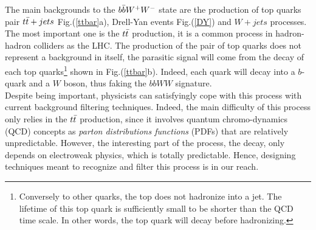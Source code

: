 The main backgrounds to the $b \Bar{b} W^+ W^-$ state are the production of top quarks pair $t \Bar{t}+ jets$ Fig.(\ref{ttbar}a), Drell-Yan events Fig.(\ref{DY}) and $W+ jets$ processes.\\
The most important one is the $t \Bar{t}$ production, it is a common process in hadron-hadron colliders as the LHC. The production of the pair of top quarks does not represent a background in itself, the parasitic signal will come from the decay of each top quarks\footnote{Conversely to other quarks, the top does not hadronize into a jet. The lifetime of this top quark is sufficiently small to be shorter than the QCD time scale. In other words, the top quark will decay before hadronizing.} shown in Fig.(\ref{ttbar}b). Indeed, each quark will decay into a $b$-quark and a $W$ boson, thus faking the $bbWW$ signature.\\ 
Despite being important, physicists can satisfyingly cope with this process with current background filtering techniques. Indeed, the main difficulty of this process only relies in the $t \Bar{t}$ production, since it involves quantum chromo-dynamics (QCD) concepts as \textit{parton distributions functions} (PDFs) that are relatively unpredictable. However, the interesting part of the process, the decay, only depends on electroweak physics, which is totally predictable. Hence, designing techniques meant to recognize and filter this process is in our reach.\\

